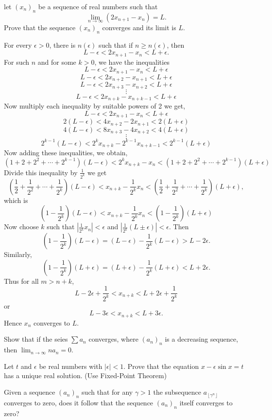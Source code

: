 \question let $(x_n)_n$ be a sequence of real numbers such that $$\lim_{n\to\infty}{(2x_{n+1}-x_n)}=L.$$
Prove that the sequence $(x_n)_n$ converges and its limit is $L$.
\begin{solution}
    For every $\epsilon>0$, there is $n(\epsilon)$ such that if $n\geq n(\epsilon)$, then
    $$L-\epsilon<2x_{n+1}-x_n<L+\epsilon.$$
    For such $n$ and for some $k>0$, we have the inequalities
    $$L-\epsilon<2x_{n+1}-x_n<L+\epsilon$$
    $$L-\epsilon<2x_{n+2}-x_{n+1}<L+\epsilon$$
    $$L-\epsilon<2x_{n+3}-x_{n+2}<L+\epsilon$$
    $$\vdots$$
    $$L-\epsilon<2x_{n+k}-x_{n+k-1}<L+\epsilon$$
    Now multiply each inequality by suitable powers of 2 we get,
    $$L-\epsilon<2x_{n+1}-x_n<L+\epsilon$$
    $$2(L-\epsilon)<4x_{n+2}-2x_{n+1}<2(L+\epsilon)$$
    $$4(L-\epsilon)<8x_{n+3}-4x_{n+2}<4(L+\epsilon)$$
    $$\vdots$$
    $$2^{k-1}(L-\epsilon)<2^{k}x_{n+k}-2^{k-1}x_{n+k-1}<2^{k-1}(L+\epsilon)$$
    Now adding these inequalities, we obtain,
    $$(1+2+2^2+\cdots+2^{k-1})(L-\epsilon)<2^{k}x_{n+k}-x_n<(1+2+2^2+\cdots+2^{k-1})(L+\epsilon)$$
    Divide this inequality by $\frac{1}{2^k}$ we get
    $$\left(\frac{1}{2}+\frac{1}{2^2}+\cdots+\frac{1}{2^k}\right)(L-\epsilon)<x_{n+k}-\frac{1}{2^{k}}x_n<\left(\frac{1}{2}+\frac{1}{2^2}+\cdots+\frac{1}{2^k}\right)(L+\epsilon),$$
    which is
    $$\left(1-\frac{1}{2^k}\right)(L-\epsilon)<x_{n+k}-\frac{1}{2^{k}}x_n<\left(1-\frac{1}{2^k}\right)(L+\epsilon)$$
    Now choose $k$ such that $\left|\frac{1}{2^{k}}x_n\right|<\epsilon$ and $\left|\frac{1}{2^{k}}(L\pm\epsilon)\right|<\epsilon$. Then
    $$\left(1-\frac{1}{2^k}\right)(L-\epsilon)=(L-\epsilon)-\frac{1}{2^{k}}(L-\epsilon)>L-2\epsilon.$$
    Similarly,
    $$\left(1-\frac{1}{2^k}\right)(L+\epsilon)=(L+\epsilon)-\frac{1}{2^{k}}(L+\epsilon)<L+2\epsilon.$$
    Thus for all $m>n+k$,
    $$L-2\epsilon+\frac{1}{2^{k}}<x_{n+k}<L+2\epsilon+\frac{1}{2^{k}}$$
    or
    $$L-3\epsilon<x_{n+k}<L+3\epsilon.$$
    Hence $x_n$ converges to $L$.
\end{solution}

\question[P\&B, 329] Show that if the seies $\sum{a_n}$ converges, where $(a_n)_n$ is a decreasing sequence, then $\lim_{n\to\infty}{na_n}=0$.

\question[P\&B, 331] Let $t$ and $\epsilon$ be real numbers with $|\epsilon|<1$. Prove that the equation $x-\epsilon\sin{x}=t$ has a unique real solution. (Use Fixed-Point Theorem)

\question[P\&B, 350] Given a sequence $(a_n)_n$ such that for any $\gamma>1$ the subsequence $a_{\left\lfloor\gamma^n\right\rfloor}$ converges to zero, does it follow that the sequence $(a_n)_n$ itself converges to zero?

